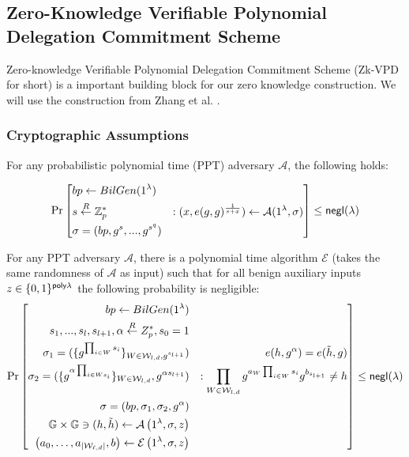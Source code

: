 
\subsection{Zero-Knowledge Verifiable Polynomial Delegation Commitment Scheme}
\label{subsec::zkvpd}
Zero-knowledge Verifiable Polynomial Delegation Commitment Scheme (Zk-VPD for short) is a important building block for our zero knowledge construction. We will use the construction from Zhang et al. \cite{zkvpd}.

\subsubsection{Cryptographic Assumptions}

\begin{assumption}
	\label{asp::qSDH}
	For any probabilistic polynomial time (PPT) adversary $\mathcal{A}$, the following holds:

	\[\Pr\left[ \begin{aligned}
		&bp \leftarrow BilGen(1^\lambda) & \\
		&s \overset{R}{\leftarrow} \mathbb{Z}^{*}_{p} & : (x, e(g, g)^{\frac{1}{s+x}}) \leftarrow \mathcal{A}(1^\lambda, \sigma)\\
		&\sigma = (bp, g^s, ..., g^{s^q})
	\end{aligned} \right] \le {\sf negl}{(\lambda)}\]
\end{assumption}
\begin{assumption}
	\label{asp::dlEPKE}
	For any PPT adversary $\mathcal{A}$, there is a polynomial time algorithm $\mathcal{E}$ (takes the same randomness of $\mathcal{A}$ as input) such that for all benign auxiliary inputs $z \in \{0,1\}^{{\sf poly}{\lambda}}$ the following probability is negligible:
	\[\Pr\left[ \begin{aligned}
					bp \leftarrow BilGen(1^\lambda) && \\
					s_1, ..., s_l, s_{l + 1}, \alpha \overset{R}{\leftarrow} Z_{p}^*, s_0=1 && \\
					\sigma_1 = (\{g^{\prod_{i\in W}s_i}\}_{W\in \mathcal{W}_{l, d}, g^{s_{l+1}}}) &&\hspace*{10pt} e(h, g^\alpha)=e(\tilde{h}, g)\\
					\sigma_2 = (\{g^{\alpha\prod_{i\in Ws_i}}\}_{W\in \mathcal{W}_{l, d}}, g^{\alpha s_{l+1}}) && : \prod_{W\in \mathcal{W}_{l, d}}g^{a_{W}\prod_{i\in W}s_i}g^{b_{s_{l+1}}}\neq h\\
					\sigma = (bp, \sigma_1, \sigma_2, g^{\alpha}) && \\
					\mathbb{G} \times \mathbb{G} \ni (h, \tilde{h}) \leftarrow \mathcal{A} \left(1^{\lambda}, \sigma, z\right)&& \\
					\left( a _ { 0 } , \dots , a _ { \left| \mathcal { W } _ { \ell , d } \right| } , b \right) \leftarrow \mathcal { E } \left( 1 ^ { \lambda } , \sigma , z \right) &&
				\end{aligned}\right] \le {\sf negl}{(\lambda)}\]
\end{assumption}

